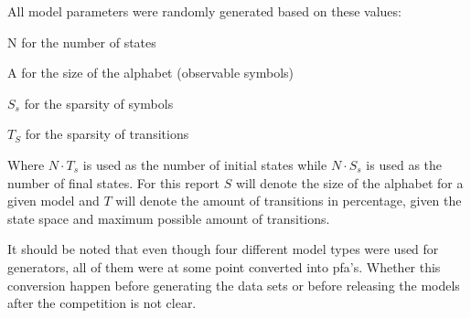 All model parameters were randomly generated based on these values:
\begin{description}
\item N for the number of states
\item A for the size of the alphabet (observable symbols)
\item $S_s$ for the sparsity of symbols
\item $T_S$ for the sparsity of transitions
\end{description}
Where $N \cdot T_s$ is used as the number of initial states while $N \cdot S_s$ is used as the number of final states. For this report $S$ will denote the size of the alphabet for a given model and $T$ will denote the amount of transitions in percentage, given the state space and maximum possible amount of transitions.

It should be noted that even though four different model types were used for generators, all of them were at some point converted into \gls{pfa}'s. Whether this conversion happen before generating the data sets or before releasing the models after the competition is not clear.